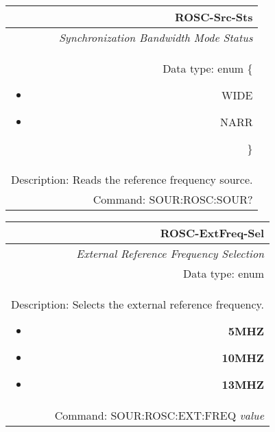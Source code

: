 \documentclass[openany]{article}
\begin{document}
		\begin{tabular}{N}
			\hline
			\bfseries ROSC-Src-Sts \\ \hline
			\emph{Synchronization Bandwidth Mode Status} \\
			Data type: enum \{\begin{itemize}[noitemsep]
				\small
				\item[] WIDE
				\item[] NARR
			\end{itemize}\} \\ 
			Description: Reads the reference frequency source. \\
			Command: SOUR:ROSC:SOUR? \\

		\end{tabular}
%
		\begin{tabular}{N}
			\hline
			\bfseries ROSC-ExtFreq-Sel \\ \hline
			\emph{External Reference Frequency Selection} \\
			Data type: enum \\   
			Description: Selects the external reference frequency.\begin{itemize}[noitemsep]
				\small
				\item[] \textbf{5MHZ}
                                \item[] \textbf{10MHZ}
				\item[] \textbf{13MHZ}

			\end{itemize} \\
			Command: SOUR:ROSC:EXT:FREQ \emph{value} \\

		\end{tabular}
\end{document}
